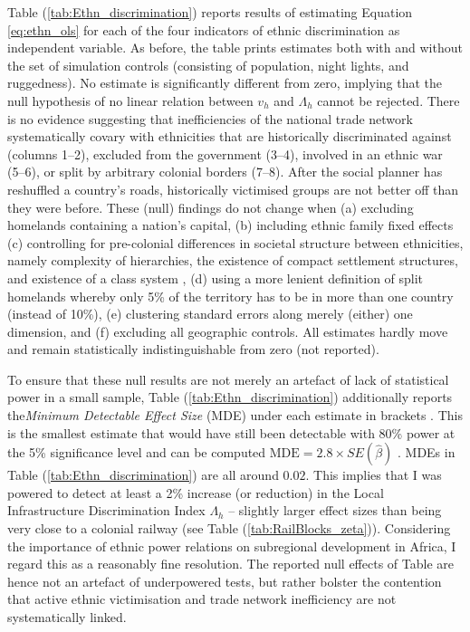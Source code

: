 \documentclass[11pt, oneside]{article}   	%
\let\oldref\ref
\renewcommand{\ref}[1]{(\oldref{#1})}
\begin{document}
Table \ref{tab:Ethn_discrimination} reports results of estimating Equation \eqref{eq:ethn_ols} for each of the four indicators of ethnic discrimination as independent variable. As before, the table prints estimates both with and without the set of simulation controls (consisting of population, night lights, and ruggedness). No estimate is significantly different from zero, implying that the null hypothesis of no linear relation between $v_{h}$ and $\Lambda_{h}$ cannot be rejected. There is no evidence suggesting that inefficiencies of the national trade network systematically covary with ethnicities that are historically discriminated against (columns 1--2), excluded from the government (3--4), involved in an ethnic war (5--6), or split by arbitrary colonial borders (7--8). After the social planner has reshuffled a country's roads, historically victimised groups are not better off than they were before. These (null) findings do not change when (a) excluding homelands containing a nation's capital, (b) including ethnic family fixed effects (c) controlling for pre-colonial differences in societal structure between ethnicities, namely complexity of hierarchies, the existence of compact settlement structures, and existence of a class system \citep{Michalopoulos_PreColonialEthnicInstitutions_2013}, (d) using a more lenient definition of split homelands whereby only 5\% of the territory has to be in more than one country (instead of 10\%), (e) clustering standard errors along merely (either) one dimension, and (f) excluding all geographic controls. All estimates hardly move and remain statistically indistinguishable from zero (not reported).

To ensure that these null results are not merely an artefact of lack of statistical power in a small sample, Table \ref{tab:Ethn_discrimination} additionally reports the\emph{Minimum Detectable Effect Size} (MDE) under each estimate in brackets \citep{Haushofer_ShorttermImpactUnconditional_2016}. This is the smallest estimate that would have still been detectable with 80\% power at the 5\% significance level and can be computed $\textrm{MDE} = 2.8 \times SE(\hat{\beta})$ \citep[see ][]{Haushofer_ShorttermImpactUnconditional_2016}. MDEs in Table \ref{tab:Ethn_discrimination} are all around $0.02$. This implies that I was powered to detect at least a 2\% increase (or reduction) in the Local Infrastructure Discrimination Index $\Lambda_{h}$ -- slightly larger effect sizes than being very close to a colonial railway (see Table \ref{tab:RailBlocks_zeta}). Considering the importance of ethnic power relations on subregional development in Africa, I regard this as a reasonably fine resolution. The reported null effects of Table are hence not an artefact of underpowered tests, but rather bolster the contention that active ethnic victimisation and trade network inefficiency are not systematically linked.
\end{document}
